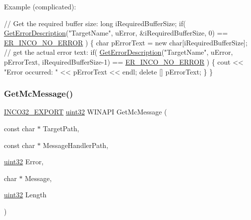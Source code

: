 Example (complicated)\+: 
\begin{DoxyCode}
\textcolor{comment}{// Get the required buffer size:}
\textcolor{keywordtype}{long} iRequiredBufferSize;
\textcolor{keywordflow}{if}( \hyperlink{group__commonfunctions_ga2ce71629197df864b4ca9121feaff795}{GetErrorDescription}(\textcolor{stringliteral}{"TargetName"}, uError, &iRequiredBufferSize, 0) == 
      \hyperlink{errinco_8h_ac806a12a2f08c29e901360403c9e239e}{ER\_INCO\_NO\_ERROR} ) \{
    \textcolor{keywordtype}{char} pErrorText = \textcolor{keyword}{new} \textcolor{keywordtype}{char}[iRequiredBufferSize];
    \textcolor{comment}{// get the actual error text:}
    \textcolor{keywordflow}{if}( \hyperlink{group__commonfunctions_ga2ce71629197df864b4ca9121feaff795}{GetErrorDescription}(\textcolor{stringliteral}{"TargetName"}, uError, pErrorText, iRequiredBufferSize-1) == 
      \hyperlink{errinco_8h_ac806a12a2f08c29e901360403c9e239e}{ER\_INCO\_NO\_ERROR} ) \{
        cout << \textcolor{stringliteral}{"Error occurred: "} << pErrorText << endl;
        \textcolor{keyword}{delete} [] pErrorText;
    \}
\}
\end{DoxyCode}
 \mbox{\label{group__commonfunctions_gae35d1b67b8052ac2411a9c899141854f}} 
\subsubsection{\texorpdfstring{Get\+Mc\+Message()}{GetMcMessage()}}
{\footnotesize\ttfamily \hyperlink{inco__32_8h_a09505cad5bbb66fc36750a4fbca0444b}{I\+N\+C\+O32\+\_\+\+E\+X\+P\+O\+RT} \hyperlink{indeltypes_8h_a4b435a49c74bb91f284f075e63416cb6}{uint32} W\+I\+N\+A\+PI Get\+Mc\+Message (\begin{DoxyParamCaption}\item[{const char $\ast$}]{Target\+Path,  }\item[{const char $\ast$}]{Message\+Handler\+Path,  }\item[{\hyperlink{indeltypes_8h_a4b435a49c74bb91f284f075e63416cb6}{uint32}}]{Error,  }\item[{char $\ast$}]{Message,  }\item[{\hyperlink{indeltypes_8h_a4b435a49c74bb91f284f075e63416cb6}{uint32}}]{Length }\end{DoxyParamCaption})}

